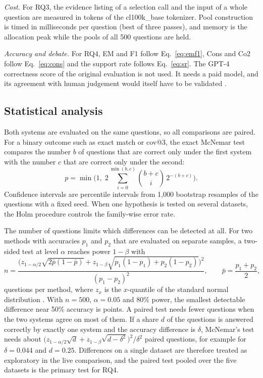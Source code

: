 \emph{Cost.} For RQ3, the evidence listing of a selection call and the input of a whole question are measured in tokens of the cl100k\_base tokenizer. Pool construction is timed in milliseconds per question (best of three passes), and memory is the allocation peak while the pools of all 500 questions are held.

\emph{Accuracy and debate.} For RQ4, EM and F1 follow Eq.~\eqref{eq:emf1}, Cons and Co2 follow Eq.~\eqref{eq:cons} and the support rate follows Eq.~\eqref{eq:sr}. The GPT-4 correctness score of the original evaluation is not used. It needs a paid model, and its agreement with human judgement would itself have to be validated \cite{zheng2023judge}.

\subsection{Statistical analysis}
Both systems are evaluated on the same questions, so all comparisons are paired. For a binary outcome such as exact match or cov@3, the exact McNemar test compares the number $b$ of questions that are correct only under the first system with the number $c$ that are correct only under the second:
\begin{equation}
p = \min\Big(1,\; 2\sum_{i=0}^{\min(b,c)}\binom{b+c}{i}\,2^{-(b+c)}\Big).
\label{eq:mcnemar}
\end{equation}
Confidence intervals are percentile intervals from 1,000 bootstrap resamples of the questions with a fixed seed. When one hypothesis is tested on several datasets, the Holm procedure controls the family-wise error rate.

The number of questions limits which differences can be detected at all. For two methods with accuracies $p_1$ and $p_2$ that are evaluated on separate samples, a two-sided test at level $\alpha$ reaches power $1-\beta$ with
\begin{equation}
n = \frac{\Big(z_{1-\alpha/2}\sqrt{2\bar p(1-\bar p)} + z_{1-\beta}\sqrt{p_1(1-p_1)+p_2(1-p_2)}\Big)^2}{(p_1-p_2)^2},
\qquad \bar p = \frac{p_1+p_2}{2},
\label{eq:power}
\end{equation}
questions per method, where $z_x$ is the $x$-quantile of the standard normal distribution \cite{cohen1988power}. With $n=500$, $\alpha=0.05$ and 80\% power, the smallest detectable difference near 50\% accuracy is \VPowHalfMargin{} points. A paired test needs fewer questions when the two systems agree on most of them. If a share $d$ of the questions is answered correctly by exactly one system and the accuracy difference is $\delta$, McNemar's test needs about $\big(z_{1-\alpha/2}\sqrt{d}+z_{1-\beta}\sqrt{d-\delta^2}\big)^2/\delta^2$ paired questions, for example \VPairedNeed{} for $\delta=0.044$ and $d=0.25$. Differences on a single dataset are therefore treated as exploratory in the live comparison, and the paired test pooled over the five datasets is the primary test for RQ4.

